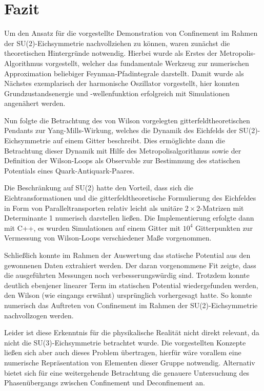 
\chapter{Fazit}
\label{sec:fazit}

Um den Ansatz für die vorgestellte Demonstration von Confinement im Rahmen der
SU(2)-Eichsymmetrie nachvollziehen zu können, waren zunächst die theoretischen
Hintergründe notwendig. Hierbei wurde als Erstes der Metropolis-Algorithmus
vorgestellt, welcher das fundamentale Werkzeug zur numerischen Approximation
beliebiger Feynman-Pfadintegrale darstellt. Damit wurde als Nächstes exemplarisch
der harmonische Oszillator vorgestellt, hier konnten Grundzustandsenergie und
-wellenfunktion erfolgreich mit Simulationen angenähert werden.

Nun folgte die Betrachtung des von Wilson vorgelegten gitterfeldtheoretischen
Pendants zur Yang-Mills-Wirkung, welches die Dynamik des Eichfelds der
SU(2)-Eichsymmetrie auf einem Gitter beschreibt. Dies ermöglichte dann die
Betrachtung dieser Dynamik mit Hilfe des Metropolisalgorithmus sowie der
Definition der Wilson-Loops als Observable zur Bestimmung des statischen
Potentials eines Quark-Antiquark-Paares.

Die Beschränkung auf SU(2) hatte den Vorteil, dass sich die Eichtransformationen
und die gitterfeldtheoretische Formulierung des Eichfeldes in Form von
Paralleltransporten relativ leicht als unitäre $2 \times 2$-Matrizen mit
Determinante 1 numerisch darstellen ließen. Die Implementierung erfolgte dann
mit C++, es wurden Simulationen auf einem Gitter mit $10^4$ Gitterpunkten
zur Vermessung von Wilson-Loops verschiedener Maße vorgenommen.

Schließlich konnte im Rahmen der Auswertung das statische Potential aus den
gewonnenen Daten extrahiert werden. Der daran vorgenommene Fit zeigte, dass
die ausgeführten Messungen noch verbesserungswürdig sind. Trotzdem konnte
deutlich ebenjener linearer Term im statischen Potential wiedergefunden werden,
den Wilson (wie eingangs erwähnt) ursprünglich vorhergesagt hatte. So konnte
numerisch das Auftreten von Confinement im Rahmen der SU(2)-Eichsymmetrie
nachvollzogen werden.

Leider ist diese Erkenntnis für die physikalische Realität nicht direkt
relevant, da nicht die SU(3)-Eichsymmetrie betrachtet wurde. Die vorgestellten
Konzepte ließen sich aber auch dieses Problem übertragen, hierfür wäre vorallem
eine numerische Repräsentation von Elementen dieser Gruppe notwendig. Alternativ
bietet sich für eine weitergehende Betrachtung die genauere Untersuchung des
Phasenübergangs zwischen Confinement und Deconfinement an.

